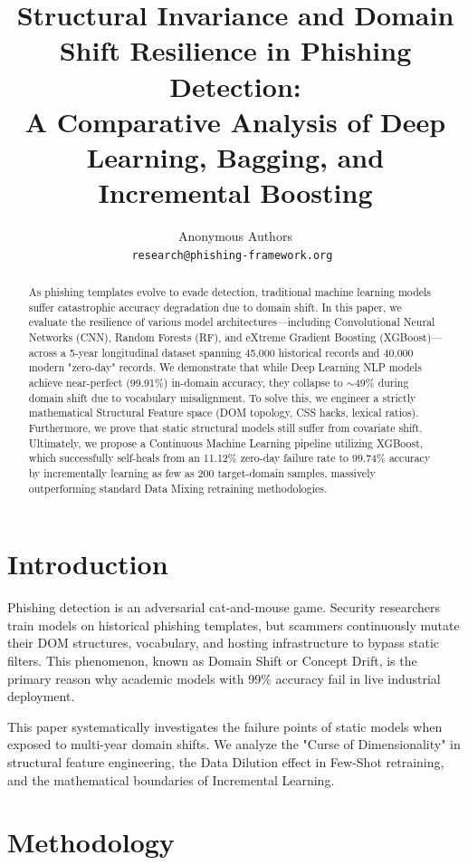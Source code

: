 \documentclass[10pt,twocolumn,letterpaper]{article}
\title{Structural Invariance and Domain Shift Resilience in Phishing Detection:\\A Comparative Analysis of Deep Learning, Bagging, and Incremental Boosting}
\author{
Anonymous Authors\\
\tt\small research@phishing-framework.org
}
\begin{document}
\maketitle

\begin{abstract}
As phishing templates evolve to evade detection, traditional machine learning models suffer catastrophic accuracy degradation due to domain shift. In this paper, we evaluate the resilience of various model architectures—including Convolutional Neural Networks (CNN), Random Forests (RF), and eXtreme Gradient Boosting (XGBoost)—across a 5-year longitudinal dataset spanning 45,000 historical records and 40,000 modern "zero-day" records. We demonstrate that while Deep Learning NLP models achieve near-perfect (99.91\%) in-domain accuracy, they collapse to $\sim$49\% during domain shift due to vocabulary misalignment. To solve this, we engineer a strictly mathematical Structural Feature space (DOM topology, CSS hacks, lexical ratios). Furthermore, we prove that static structural models still suffer from covariate shift. Ultimately, we propose a Continuous Machine Learning pipeline utilizing XGBoost, which successfully self-heals from an 11.12\% zero-day failure rate to 99.74\% accuracy by incrementally learning as few as 200 target-domain samples, massively outperforming standard Data Mixing retraining methodologies.
\end{abstract}

\section{Introduction}
Phishing detection is an adversarial cat-and-mouse game. Security researchers train models on historical phishing templates, but scammers continuously mutate their DOM structures, vocabulary, and hosting infrastructure to bypass static filters. This phenomenon, known as Domain Shift or Concept Drift, is the primary reason why academic models with 99\% accuracy fail in live industrial deployment.

This paper systematically investigates the failure points of static models when exposed to multi-year domain shifts. We analyze the "Curse of Dimensionality" in structural feature engineering, the Data Dilution effect in Few-Shot retraining, and the mathematical boundaries of Incremental Learning. 

\section{Methodology}
\end{document}
